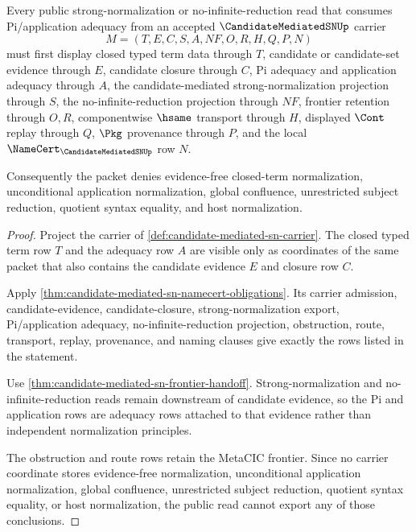 \begin{theorem}
\label{thm:candidate-mediated-sn-pi-application-frontier}
Every public strong-normalization or no-infinite-reduction read that consumes Pi/application adequacy from an accepted $\CandidateMediatedSNUp$ carrier
$$
M=(T,E,C,S,A,NF,O,R,H,Q,P,N)
$$
must first display closed typed term data through $T$, candidate or candidate-set evidence through $E$, candidate closure through $C$, Pi adequacy and application adequacy through $A$, the candidate-mediated strong-normalization projection through $S$, the no-infinite-reduction projection through $NF$, frontier retention through $O,R$, componentwise $\hsame$ transport through $H$, displayed $\Cont$ replay through $Q$, $\Pkg$ provenance through $P$, and the local $\NameCert_{\CandidateMediatedSNUp}$ row $N$.

Consequently the packet denies evidence-free closed-term normalization, unconditional application normalization, global confluence, unrestricted subject reduction, quotient syntax equality, and host normalization.
\end{theorem}
\begin{proof}
Project the carrier of \autoref{def:candidate-mediated-sn-carrier}. The closed typed term row $T$ and the adequacy row $A$ are visible only as coordinates of the same packet that also contains the candidate evidence $E$ and closure row $C$.

Apply \autoref{thm:candidate-mediated-sn-namecert-obligations}. Its carrier admission, candidate-evidence, candidate-closure, strong-normalization export, Pi/application adequacy, no-infinite-reduction projection, obstruction, route, transport, replay, provenance, and naming clauses give exactly the rows listed in the statement.

Use \autoref{thm:candidate-mediated-sn-frontier-handoff}. Strong-normalization and no-infinite-reduction reads remain downstream of candidate evidence, so the Pi and application rows are adequacy rows attached to that evidence rather than independent normalization principles.

The obstruction and route rows retain the MetaCIC frontier. Since no carrier coordinate stores evidence-free normalization, unconditional application normalization, global confluence, unrestricted subject reduction, quotient syntax equality, or host normalization, the public read cannot export any of those conclusions.
\end{proof}

